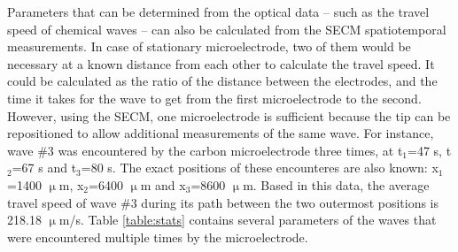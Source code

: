 \documentclass[3p, twocolumn]{elsarticle}
\begin{document}
Parameters that can be determined from the optical data -- such as the travel speed of chemical waves -- can also be calculated from the SECM spatiotemporal measurements.
In case of stationary microelectrode, two of them would be necessary at a known distance from each other to calculate the travel speed.
It could be calculated as the ratio of the distance between the electrodes, and the time it takes for the wave to get from the first microelectrode to the second.
However, using the SECM, one microelectrode is sufficient because the tip can be repositioned to allow additional measurements of the same wave.
For instance, wave \#3 was encountered by the carbon microelectrode three times, at t$_1$=47 s, t$_2$=67 s and t$_3$=80 s.
The exact positions of these encounteres are also known: x$_1$=1400 $\upmu$m, x$_2$=6400 $\upmu$m and x$_3$=8600 $\upmu$m.
Based in this data, the average travel speed of wave \#3 during its path between the two outermost positions is 218.18 $\upmu$m/s.
Table \ref{table:stats} contains several parameters of the waves that were encountered multiple times by the microelectrode. 
\end{document}
